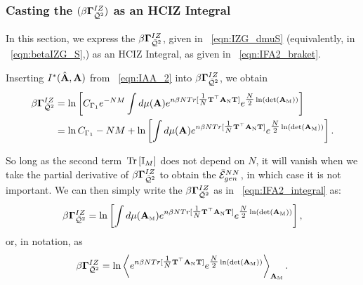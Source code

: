 \subsubsection{Casting the \GeneratingFunction \texorpdfstring{$(\beta\mathbf{\Gamma}^{IZ}_{\bar{\mathcal{Q}}^{2}})$}{beta G} as an HCIZ Integral}
\label{sxn:TraceLogDerivation_B}

In this section, we express the \GeneratingFunction $\beta\mathbf{\Gamma}^{IZ}_{\bar{\mathcal{Q}}^{2}}$, 
given in \EQN~\ref{eqn:IZG_dmuS} (equivalently, in \EQN~\ref{eqn:betaIZG_S},) 
as an HCIZ Integral, 
as given in \EQN~\ref{eqn:IFA2_braket}.

Inserting $I^{*}(\hat{\mathbf{A}},\mathbf{A})$ from \EQN~\ref{eqn:IAA_2} into $\beta\mathbf{\Gamma}^{IZ}_{\bar{\mathcal{Q}}^{2}}$, we obtain
\begin{align}
  \label{eqn:IZG_IAA}
  \IZG 
  & =  \ln \left[ C_{\Gamma_1} e^{-NM}\int d\mu(\AMAT)
  e^{\ND\beta N Tr[ \tfrac{1}{N}\TMAT^{\top}\AMATN\TMAT] }
  e^{\tfrac{N}{2}\ln(\Det{\AMATM})}\right]  \\ \nonumber
  & =
    \ln  C_{\Gamma_1}
  - NM
  +  \ln \left[ \int d\mu(\AMAT)
    e^{\ND\beta N Tr[ \tfrac{1}{N}\TMAT^{\top}\AMATN\TMAT] }
    e^{\tfrac{N}{2}\ln(\Det{\AMATM})}\right]  .
\end{align}

\noindent
So long as the second term $\mbox{}\operatorname{Tr}\left[\mathbb{I}_{M}\right]$ does not depend on $N$, 
it will vanish when we take the partial derivative of $\beta\mathbf{\Gamma}^{IZ}_{\bar{\mathcal{Q}}^{2}}$ to obtain the $\bar{\mathcal{E}}^{NN}_{gen}$, in which case it is not important.  
We can then simply write the \GeneratingFunction $\beta\mathbf{\Gamma}^{IZ}_{\bar{\mathcal{Q}}^{2}}$  as in \EQN~\ref{eqn:IFA2_integral} as:
\begin{align}
  \label{eqn:IZG_integral}
  \IZG 
   =  \ln \left[ \int d\mu(\AMATM)
    e^{\ND\beta N Tr[ \tfrac{1}{N}\TMAT^{\top}\AMATN\TMAT] }
    e^{\tfrac{N}{2}\ln(\Det{\AMATM})}\right]  ,
\end{align}
or, in \BraKet notation, as
\begin{align}
  \label{eqn:IZG_braket}
  \IZG = 
   \ln\left\langle
  e^{\ND\beta N Tr[ \tfrac{1}{N}\TMAT^{\top}\AMATN\TMAT] }
  e^{\tfrac{N}{2}\ln(\Det{\AMATM})}
  \right\rangle_{\AMATM}   .
\end{align}



